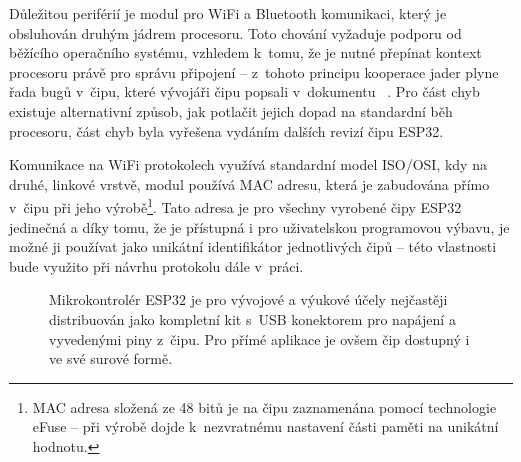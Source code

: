 Důležitou periférií je modul pro WiFi a Bluetooth komunikaci, který je obsluhován druhým jádrem procesoru.
Toto chování vyžaduje podporu od běžícího operačního systému, vzhledem k~tomu, že je nutné přepínat kontext procesoru
právě pro správu připojení -- z~tohoto principu kooperace jader plyne řada bugů v~čipu, které vývojáři čipu
popsali v~dokumentu ~\cite{ESP32KnownBugs}.
Pro část chyb existuje alternativní způsob, jak potlačit jejich dopad na standardní běh procesoru, část
chyb byla vyřešena vydáním dalších revizí čipu ESP32.

Komunikace na WiFi protokolech využívá standardní model ISO/OSI, kdy na druhé, linkové vrstvě, modul používá MAC
adresu, která je zabudována přímo v~čipu při jeho výrobě\footnote{MAC adresa složená ze 48 bitů je na čipu
zaznamenána pomocí technologie eFuse -- při výrobě dojde k~nezvratnému nastavení části paměti na unikátní hodnotu.}.
Tato adresa je pro všechny vyrobené čipy ESP32 jedinečná a díky tomu, že je přístupná i pro uživatelskou programovou
výbavu, je možné ji používat jako unikátní identifikátor jednotlivých čipů -- této vlastnosti bude využito při návrhu
protokolu dále v~práci.

\begin{figure}
    \centering
    \quad%

    \caption{Mikrokontrolér ESP32 je pro vývojové a výukové účely nejčastěji distribuován jako kompletní kit s~USB
    konektorem pro napájení a vyvedenými piny z~čipu. %
    Pro přímé aplikace je ovšem čip dostupný i ve své surové formě.}
    \label{fig:esp32}
\end{figure}

